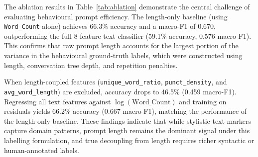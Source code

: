 The ablation results in Table~\ref{tab:ablation} demonstrate the central challenge of evaluating behavioural prompt efficiency. The length-only baseline (using \texttt{Word\_Count} alone) achieves 66.3\% accuracy and a macro-F1 of 0.670, outperforming the full 8-feature text classifier (59.1\% accuracy, 0.576 macro-F1). This confirms that raw prompt length accounts for the largest portion of the variance in the behavioural ground-truth labels, which were constructed using length, conversation tree depth, and repetition penalties.

When length-coupled features (\texttt{unique\_word\_ratio}, \texttt{punct\_density}, and \texttt{avg\_word\_length}) are excluded, accuracy drops to 46.5\% (0.459 macro-F1). Regressing all text features against $\log(\text{Word\_Count})$ and training on residuals yields 66.2\% accuracy (0.667 macro-F1), matching the performance of the length-only baseline. These findings indicate that while stylistic text markers capture domain patterns, prompt length remains the dominant signal under this labelling formulation, and true decoupling from length requires richer syntactic or human-annotated labels.